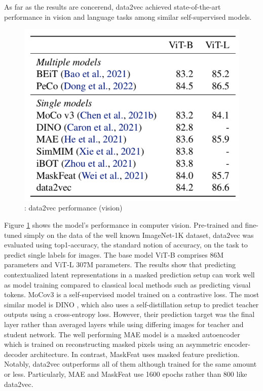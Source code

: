 \documentclass[
]{krantz}
\begin{document}
As far as the results are concerend, data2vec achieved state-of-the-art performance in vision and language tasks among similar self-supervised models.

\begin{figure}

{\centering \includegraphics[width=0.5\linewidth]{figures/05-chapter2/datavecresultsone} 

}

\caption{\citet{baevski2022data2vec}: data2vec performance (vision)}\label{fig:data2vecresults1}
\end{figure}



Figure \ref{fig:data2vecresults1} shows the model's performance in computer vision. Pre-trained and fine-tuned simply on the data of the well known ImageNet-1K dataset, data2vec was evaluated using top1-accuracy, the standard notion of accuracy, on the task to predict single labels for images. The base model ViT-B comprises 86M parameters and ViT-L 307M parameters. The results show that predicting contextualized latent representations in a masked prediction setup can work well as model training compared to classical local methods such as predicting visual tokens. MoCov3 \citep{chen2021empirical} is a self-supervised model trained on a contrastive loss. The most similar model is DINO \citep{caron2021emerging}, which also uses a self-distillation setup to predict teacher outputs using a cross-entropy loss. However, their prediction target was the final layer rather than averaged layers while using differing images for teacher and student network. The well performing MAE model \citep{he2022masked} is a masked autoencoder which is trained on reconstructing masked pixels using an asymmetric encoder-decoder architecture. In contrast, MaskFeat \citep{wei2022masked} uses masked feature prediction. Notably, data2vec outperforms all of them although trained for the same amount or less. Particularly, MAE and MaskFeat use 1600 epochs rather than 800 like data2vec.
\end{document}

